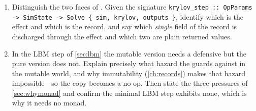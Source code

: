 \begin{enumerate}[nosep]
  \item Distinguish the two faces of . Given the signature
  \lstinline[style=l4style]|krylov_step :: OpParams -> SimState -> Solve { sim, krylov, outputs }|,
  identify which  is the effect and which is the record, and say which
  \emph{single} field of the record is discharged through the effect and which two are
  plain returned values.
  \item In the LBM step of \cref{sec:lbm} the mutable version needs a defensive
   but the pure version does not. Explain precisely what hazard the
   guards against in the mutable world, and why immutability
  (\cref{ch:records}) makes that hazard impossible---so the copy becomes a no-op. Then
  state the three pressures of \cref{sec:whymonad} and confirm the minimal LBM step
  exhibits none, which is why it needs no monad.
\end{enumerate}
